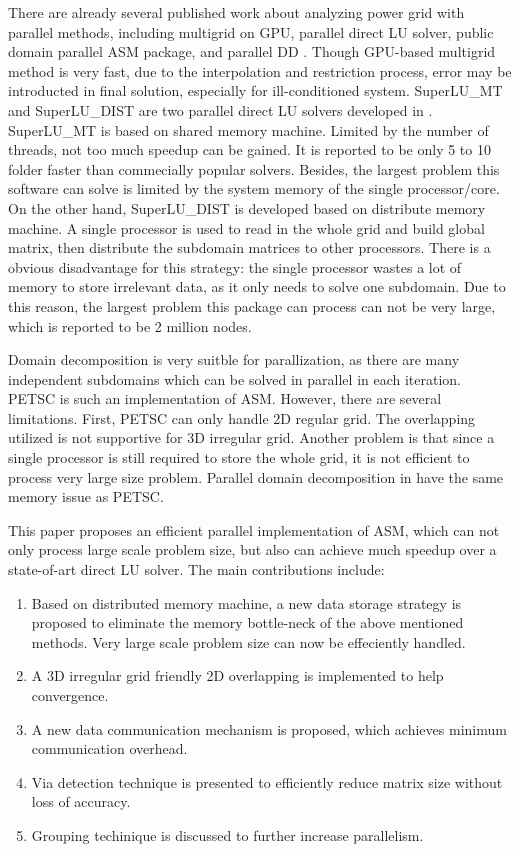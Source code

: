 \documentclass{sig-alternate}
\begin{document}
	There are already several published work about analyzing power grid with parallel methods, including multigrid on 
	GPU\cite{Zhuofeng}, parallel direct LU 
	solver\cite{Super_LU_website}, public domain parallel ASM package\cite{PETSC_website}, and parallel DD
	\cite{kaisun, voronov}. Though GPU-based multigrid method\cite{Zhuofeng} is very fast, due to the interpolation and restriction
	process, error may be
	introducted in final solution, especially for ill-conditioned system. SuperLU\_MT and SuperLU\_DIST are two parallel direct LU 
	solvers developed in \cite{Super_LU_website}. SuperLU\_MT is 
	based on shared memory machine. Limited by the number of threads, not too much speedup can be gained. 
	It is reported to be only 5 to 10 folder faster than commecially popular solvers\cite{Super_LU_website}. Besides, the largest 
	problem this software can solve is limited by the system memory of the single processor/core. On the other hand, SuperLU\_DIST 
	is developed based on distribute memory machine. A single processor is used to read in the whole grid and build global 
	matrix, then distribute the subdomain matrices to other processors. 
	There is a obvious disadvantage for this strategy: the single processor wastes a lot of memory to store irrelevant data, as 
	it only needs to solve one subdomain. Due to this reason, the largest problem this package can 
	process can not be very large, which is reported to be 2 million nodes\cite{Super_LU_website}.

	Domain decomposition is very suitble for parallization, as there are many independent subdomains which can be
	solved in parallel in each iteration. PETSC\cite{PETSC_website} is such an implementation of ASM.
	However, there are several limitations. First, PETSC can only handle 2D regular grid. 
	The overlapping utilized is not supportive for 3D irregular grid. Another problem is that since a single processor is 
	still required to
	store the whole grid, it is not efficient to process very large size problem. Parallel domain decomposition in \cite{kaisun, voronov} have
	the same memory issue as PETSC.

	This paper proposes an efficient parallel implementation of ASM, which can not only process large scale problem size, 
	but also can achieve much speedup over a state-of-art direct LU solver. The main contributions include:
	\begin{enumerate}[1)]
	\item Based on distributed memory machine, a new data storage strategy is proposed to eliminate the memory bottle-neck of
	the above mentioned methods. Very large scale problem size can now be effeciently handled.
	\item A 3D irregular grid friendly 2D overlapping is implemented to help convergence. 
	\item A new data communication mechanism is proposed, which achieves minimum communication overhead.
	\item Via detection technique is presented to efficiently reduce matrix size without loss of accuracy.
	\item Grouping techinique is discussed to further increase parallelism.
	\end{enumerate}
\end{document}
